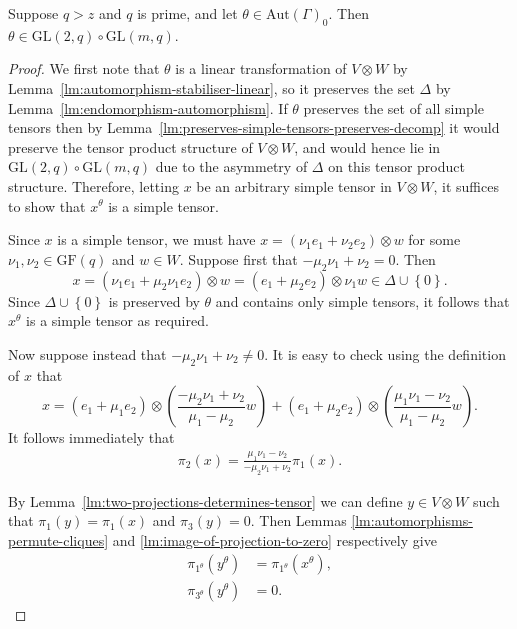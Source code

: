 \documentclass[ALCO, Unicode]{cedram}
\newcommand{\Aut}{\mathrm{Aut}}
\newcommand{\GF}{\mathrm{GF}}
\newcommand{\GL}{\mathrm{GL}}
\begin{document}
\begin{lemma} \label{lm:automorphism-stabiliser-fixes-tensor-decomposition}
Suppose $q > z$ and $q$ is prime, and let $\theta \in \Aut{\left(\Gamma \right)}_0$. Then $\theta \in \GL{\left(2, q \right)} \circ \GL{\left(m, q \right)}$.
\end{lemma}
\begin{proof}
We first note that $\theta$ is a linear transformation of $V \otimes W$ by Lemma~\ref{lm:automorphism-stabiliser-linear}, so it preserves the set $\Delta$ by Lemma~\ref{lm:endomorphism-automorphism}. If $\theta$ preserves the set of all simple tensors then by Lemma~\ref{lm:preserves-simple-tensors-preserves-decomp} it would preserve the tensor product structure of $V \otimes W$, and would hence lie in $\GL{\left(2, q \right)} \circ \GL{\left(m, q \right)}$ due to the asymmetry of $\Delta$ on this tensor product structure. Therefore, letting $x$ be an arbitrary simple tensor in $V \otimes W$, it suffices to show that $x^\theta$ is a simple tensor.

Since $x$ is a simple tensor, we must have $x = \left(\nu_1 e_1 + \nu_2 e_2 \right) \otimes w$ for some $\nu_1, \nu_2 \in \GF{\left(q \right)}$ and $w \in W$. Suppose first that $-\mu_2 \nu_1 + \nu_2 = 0$. Then
\begin{displaymath}
    x = \left(\nu_1 e_1 + \mu_2 \nu_1 e_2 \right) \otimes w = \left(e_1 + \mu_2 e_2 \right) \otimes \nu_1 w \in \Delta \cup {\left\{0 \right\}}.
\end{displaymath}
Since $\Delta \cup \left\{0 \right\}$ is preserved by $\theta$ and contains only simple tensors, it follows that $x^\theta$ is a simple tensor as required.

Now suppose instead that $-\mu_2 \nu_1 + \nu_2 \neq 0$. It is easy to check using the definition of $x$ that
\begin{displaymath}
    x = \left(e_1 + \mu_1 e_2 \right) \otimes \left(\frac{-\mu_2 \nu_1 + \nu_2}{\mu_1 - \mu_2} w \right) + \left(e_1 + \mu_2 e_2 \right) \otimes {\left(\frac{\mu_1 \nu_1 - \nu_2}{\mu_1 - \mu_2} w \right)}.
\end{displaymath}
It follows immediately that
\begin{align}
    \pi_2{\left(x \right)} = \frac{\mu_1 \nu_1 - \nu_2}{-\mu_2 \nu_1 + \nu_2} \pi_1{\left(x \right)}. \label{eqn:projection-ratio}
\end{align}

By Lemma~\ref{lm:two-projections-determines-tensor} we can define $y \in V \otimes W$ such that $\pi_1{\left(y \right)} = \pi_1{\left(x \right)}$ and $\pi_3{\left(y \right)} = 0$. Then Lemmas \ref{lm:automorphisms-permute-cliques} and \ref{lm:image-of-projection-to-zero} respectively give
\begin{align}
    \pi_{1^\theta}{\left(y^\theta \right)} &= \pi_{1^\theta}{\left(x^\theta \right)}, \label{eqn:matching-projection-1-image} \\
    \pi_{3^\theta}{\left(y^\theta \right)} &= 0. \label{eqn:projection-3-image-zero}
\end{align}


\end{proof}
\end{document}
